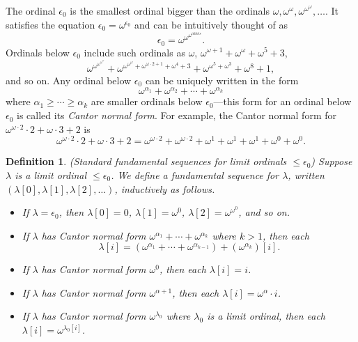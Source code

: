 \documentclass{article}
\newtheorem{definition}[theorem]{Definition}
\begin{document}
The ordinal $\epsilon_0$ is the smallest ordinal bigger than the ordinals
$\omega,\omega^\omega,\omega^{\omega^\omega},\ldots$. It satisfies the equation
$\epsilon_0=\omega^{\epsilon_0}$ and can be intuitively thought of as
\[
    \epsilon_0 = \omega^{\omega^{\omega^{iddots}}}.
\]
Ordinals below $\epsilon_0$ include such ordinals as $\omega$,
$\omega^{\omega+1}+\omega^{\omega}+\omega^5+3$,
\[
\omega^{\omega^{\omega^{\omega^\omega}}}+
\omega^{\omega^{\omega^\omega}+\omega^{\omega\cdot 2+1}+\omega^4 + 3}
+ \omega^{\omega^5+\omega^3}+\omega^8+1,
\]
and so on.
Any ordinal below $\epsilon_0$ can be uniquely written in the form
\[
    \omega^{\alpha_1}+\omega^{\alpha_2}+\cdots + \omega^{\alpha_k}
\]
where $\alpha_1\geq\cdots\geq\alpha_k$ are smaller ordinals below $\epsilon_0$---this form
for an ordinal below $\epsilon_0$ is called its \emph{Cantor normal form}.
For example, the Cantor normal form for $\omega^{\omega\cdot 2}\cdot 2+\omega\cdot 3+2$
is
\[
\omega^{\omega\cdot 2}\cdot 2+\omega\cdot 3+2
=
\omega^{\omega\cdot 2} + \omega^{\omega\cdot 2} + \omega^1 + \omega^1 + \omega^1
+\omega^0 + \omega^0.
\]

\begin{definition}
    (Standard fundamental sequences for limit ordinals $\leq\epsilon_0$)
    Suppose $\lambda$ is a limit ordinal $\leq\epsilon_0$. We define a
    \emph{fundamental sequence for $\lambda$},
    written $(\lambda[0],\lambda[1],\lambda[2],\ldots)$, inductively as follows.
    \begin{itemize}
        \item
        If $\lambda=\epsilon_0$, then $\lambda[0]=0$,
        $\lambda[1]=\omega^0$, $\lambda[2]=\omega^{\omega^0}$, and so on.
        \item
        If $\lambda$ has Cantor normal form
        $\omega^{\alpha_1}+\cdots+\omega^{\alpha_k}$ where $k>1$,
        then
        each
        \[
            \lambda[i] = (\omega^{\alpha_1}+\cdots+\omega^{\alpha_{k-1}})
            + (\omega^{\alpha_k})[i].
        \]
        \item
        If $\lambda$ has Cantor normal form $\omega^0$, then each $\lambda[i]=i$.
        \item
        If $\lambda$ has Cantor normal form $\omega^{\alpha+1}$,
        then each $\lambda[i]=\omega^{\alpha}\cdot i$.
        \item
        If $\lambda$ has Cantor normal form $\omega^{\lambda_0}$ where $\lambda_0$
        is a limit ordinal, then each $\lambda[i]=\omega^{\lambda_0[i]}$.
    \end{itemize}
\end{definition}
\end{document}
